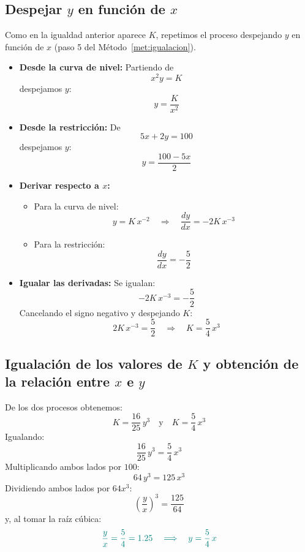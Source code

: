 \documentclass{article}
\begin{document}
\subsection*{Despejar \(y\) en función de \(x\)}
 
Como en la igualdad anterior aparece \(K\), repetimos el proceso despejando \(y\) en función de \(x\) (paso 5 del Método~\ref{met:igualacion}).
 
\begin{itemize}
    \item \textbf{Desde la curva de nivel:}
    Partiendo de
    \[
    x^2y=K
    \]
    despejamos \(y\):
    \[
    y=\frac{K}{x^2}
    \]
 
    \item \textbf{Desde la restricción:}
    De
    \[
    5x+2y=100
    \]
    despejamos \(y\):
    \[
    y=\frac{100-5x}{2}
    \]
 
    \item \textbf{Derivar respecto a \(x\):}
    \begin{itemize}
        \item Para la curva de nivel:
        \[
        y=K\,x^{-2}\quad\Longrightarrow\quad \frac{dy}{dx}=-2K\,x^{-3}
        \]
        \item Para la restricción:
        \[
        \frac{dy}{dx}=-\frac{5}{2}
        \]
    \end{itemize}
 
    \item \textbf{Igualar las derivadas:}
    Se igualan:
    \[
    -2K\,x^{-3}=-\frac{5}{2}
    \]
    Cancelando el signo negativo y despejando \(K\):
    \[
    2K\,x^{-3}=\frac{5}{2} \quad\Longrightarrow\quad K=\frac{5}{4}\,x^3
    \]
\end{itemize}
 
\subsection*{Igualación de los valores de \(K\) y obtención de la relación entre \(x\) e \(y\)}
 
De los dos procesos obtenemos:
\[
K=\frac{16}{25}\,y^3 \quad \text{y} \quad K=\frac{5}{4}\,x^3
\]
Igualando:
\[
\frac{16}{25}\,y^3=\frac{5}{4}\,x^3
\]
Multiplicando ambos lados por \(100\):
\[
64\,y^3=125\,x^3
\]
Dividiendo ambos lados por \(64x^3\):
\[
\left(\frac{y}{x}\right)^3=\frac{125}{64}
\]
y, al tomar la raíz cúbica:
\[
\color{teal}\frac{y}{x}=\frac{5}{4}=1.25 \quad\Longrightarrow\quad y=\frac{5}{4}\,x
\]
 
\end{document}
